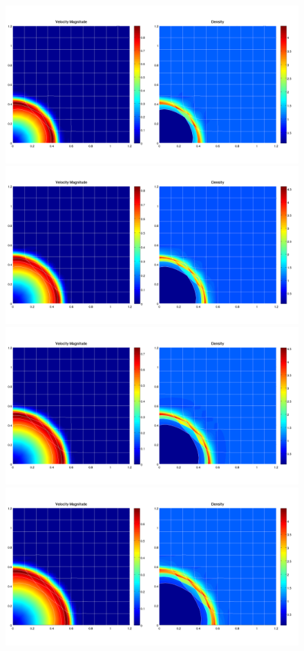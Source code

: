 \documentclass[8pt,xcolor=svgnames]{beamer}
\begin{document}
\begin{frame}
\begin{figure}[ht]
\begin{animateinline}[autoplay,width=\textwidth]{1}
    \newframe[1]
    \includegraphics{./Images/SedovAnimation/SedovAnimation_40.png}
    \newframe[1]
    \includegraphics{./Images/SedovAnimation/SedovAnimation_50.png}
    \newframe[1]
    \includegraphics{./Images/SedovAnimation/SedovAnimation_60.png}
    \newframe[1]
    \includegraphics{./Images/SedovAnimation/SedovAnimation_70.png}

\end{animateinline}
\end{figure}
\end{frame}
\end{document}
